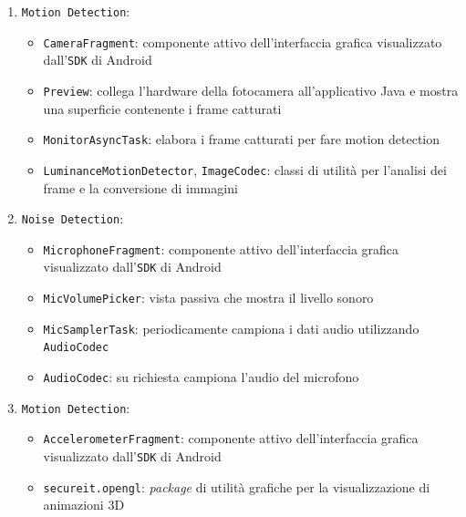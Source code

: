 \begin{enumerate}
	\item \texttt{Motion Detection}:
		\begin{itemize}
			\item \texttt{CameraFragment}: componente attivo dell'interfaccia grafica visualizzato dall'\texttt{SDK} di Android
			\item \texttt{Preview}: collega l'hardware della fotocamera all'applicativo Java e mostra una superficie contenente i frame catturati
			\item \texttt{MonitorAsyncTask}: elabora i frame catturati per fare motion detection
			\item \texttt{LuminanceMotionDetector}, \texttt{ImageCodec}: classi di utilità per l'analisi dei frame e la conversione di immagini
		\end{itemize}
	\item \texttt{Noise Detection}:
		\begin{itemize}
			\item \texttt{MicrophoneFragment}: componente attivo dell'interfaccia grafica visualizzato dall'\texttt{SDK} di Android
			\item \texttt{MicVolumePicker}: vista passiva che mostra il livello sonoro
			\item \texttt{MicSamplerTask}: periodicamente campiona i dati audio utilizzando \texttt{AudioCodec}
			\item \texttt{AudioCodec}: su richiesta campiona l'audio del microfono
		\end{itemize}
	\item \texttt{Motion Detection}:
		\begin{itemize}
			\item \texttt{AccelerometerFragment}: componente attivo dell'interfaccia grafica visualizzato dall'\texttt{SDK} di Android
			\item \texttt{secureit.opengl}: \textit{package} di utilità grafiche per la visualizzazione di animazioni 3D
		\end{itemize}
\end{enumerate}

